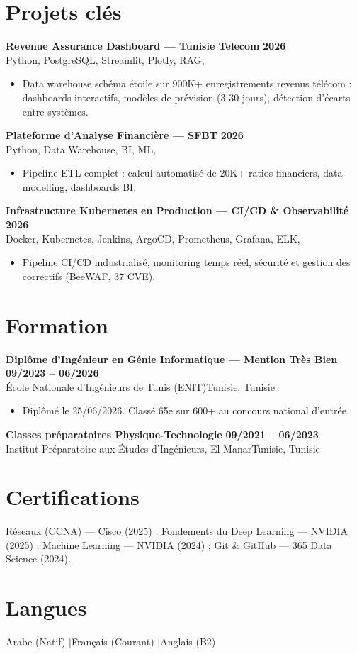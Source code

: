 \documentclass[a4paper,9pt]{article}
\newcommand{\cventry}[4]{\textbf{#1} \hfill \textbf{#4}\\[0.2pt]#2{\ifx\relax#3\relax\else, #3\fi}\par\vspace{0.3pt}}
\begin{document}
\section{Projets clés}
\cventry{Revenue Assurance Dashboard --- Tunisie Telecom}{Python, PostgreSQL, Streamlit, Plotly, RAG}{}{2026}
\begin{itemize}
  \item Data warehouse schéma étoile sur 900K+ enregistrements revenus télécom : dashboards interactifs, modèles de prévision (3-30 jours), détection d'écarts entre systèmes.
\end{itemize}
\cventry{Plateforme d'Analyse Financière --- SFBT}{Python, Data Warehouse, BI, ML}{}{2026}
\begin{itemize}
  \item Pipeline ETL complet : calcul automatisé de 20K+ ratios financiers, data modelling, dashboards BI.
\end{itemize}
\cventry{Infrastructure Kubernetes en Production --- CI/CD \& Observabilité}{Docker, Kubernetes, Jenkins, ArgoCD, Prometheus, Grafana, ELK}{}{2026}
\begin{itemize}
  \item Pipeline CI/CD industrialisé, monitoring temps réel, sécurité et gestion des correctifs (BeeWAF, 37 CVE).
\end{itemize}
\section{Formation}
\cventry{Diplôme d'Ingénieur en Génie Informatique --- Mention Très Bien}{École Nationale d'Ingénieurs de Tunis (ENIT)}{Tunisie}{09/2023 -- 06/2026}
\begin{itemize}
  \item Diplômé le 25/06/2026. Classé 65e sur 600+ au concours national d'entrée.
\end{itemize}
\cventry{Classes préparatoires Physique-Technologie}{Institut Préparatoire aux Études d'Ingénieurs, El Manar}{Tunisie}{09/2021 -- 06/2023}
\section{Certifications}
Réseaux (CCNA) --- Cisco (2025) ; Fondements du Deep Learning --- NVIDIA (2025) ; Machine Learning --- NVIDIA (2024) ; Git \& GitHub --- 365 Data Science (2024).
\section{Langues}
Arabe (Natif) \quad|\quad Français (Courant) \quad|\quad Anglais (B2)
\end{document}
